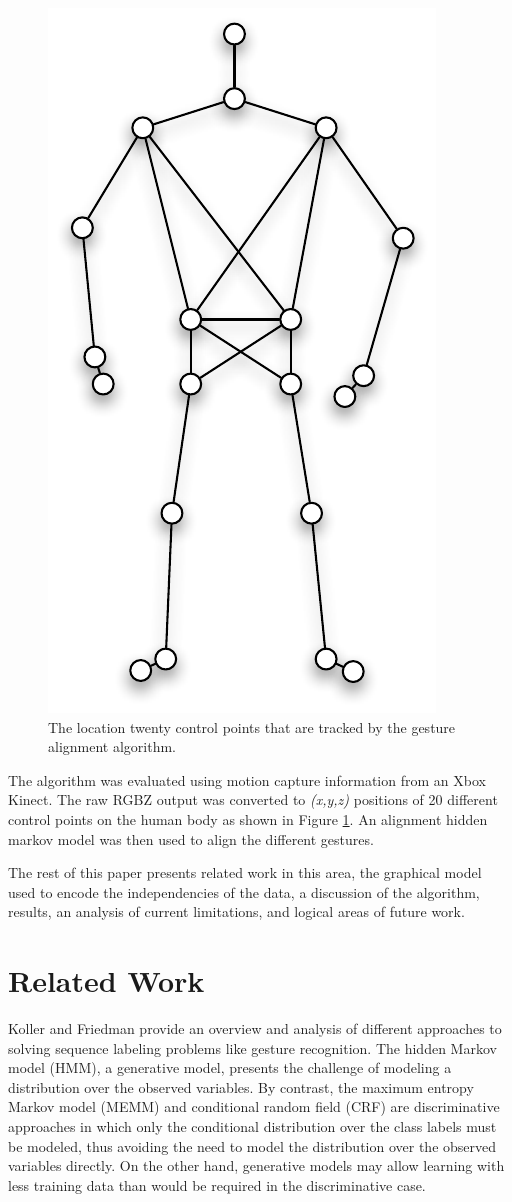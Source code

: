 \documentclass{article}
\begin{document}
\begin{figure}
\begin{centering}
\includegraphics[width=0.4\columnwidth]{figures/control_points.pdf}

\caption{The location twenty control points that are tracked by the gesture alignment
algorithm.\label{figure:control_points}}

\end{centering}
\end{figure}

The algorithm was evaluated using motion capture information from an Xbox
Kinect. The raw RGBZ output was converted to \emph{(x,y,z)} positions of 20
different control points on the human body as shown in Figure
\ref{figure:control_points}. An alignment hidden markov model was then used to
align the different gestures.

The rest of this paper presents related work in this area, the graphical model
used to encode the independencies of the data, a discussion of the algorithm,
results, an analysis of current limitations, and logical areas of future work.


\section{Related Work}

Koller and Friedman \cite{Koller2009} provide an overview and analysis of
different approaches to solving sequence labeling problems like gesture
recognition. The hidden Markov model (HMM), a generative model, presents
the challenge of modeling a distribution over the observed variables. By
contrast, the maximum entropy Markov model (MEMM) and conditional random
field (CRF) are discriminative approaches in which only the conditional
distribution over the class labels must be modeled, thus avoiding the need to
model the distribution over the observed variables directly. On the other hand,
generative models may allow learning with less training data than would be
required in the discriminative case.
\end{document}
